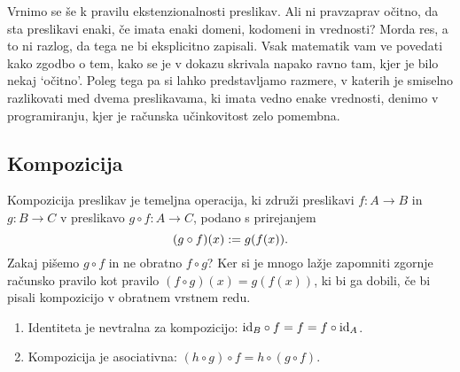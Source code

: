 Vrnimo se še k pravilu ekstenzionalnosti preslikav. Ali ni pravzaprav očitno, da sta
preslikavi enaki, če imata enaki domeni, kodomeni in vrednosti? Morda res, a to ni razlog,
da tega ne bi eksplicitno zapisali. Vsak matematik vam ve povedati kako zgodbo o tem,
kako se je v dokazu skrivala napako ravno tam, kjer je bilo nekaj `očitno'. Poleg tega
pa si lahko predstavljamo razmere, v katerih je smiselno razlikovati med dvema
preslikavama, ki imata vedno enake vrednosti, denimo v programiranju, kjer je računska učinkovitost
zelo pomembna.

\subsection{Kompozicija}
\label{sec:kompozicija}

Kompozicija preslikav je temeljna operacija, ki združi preslikavi $f : A \to B$ in $g : B \to C$ v preslikavo
$g \circ f : A \to C$, podano s prirejanjem
%
\begin{equation*}
  (g \circ f)(x) \dfeq g (f (x)).
\end{equation*}
%
Zakaj pišemo $g \circ f$ in ne obratno $f \circ g$?  Ker si je mnogo lažje zapomniti zgornje računsko pravilo kot pravilo $(f \circ g)(x) = g(f(x))$, ki bi ga dobili, če bi pisali kompozicijo v obratnem vrstnem redu.

\begin{trditev}
  \parbox{0pt}{}
  \begin{enumerate}
  \item Identiteta je nevtralna za kompozicijo: $\id[B] \circ f = f = f \circ \id[A]$.
  \item Kompozicija je asociativna: $(h \circ g) \circ f = h \circ (g \circ f)$.
  \end{enumerate}
\end{trditev}

